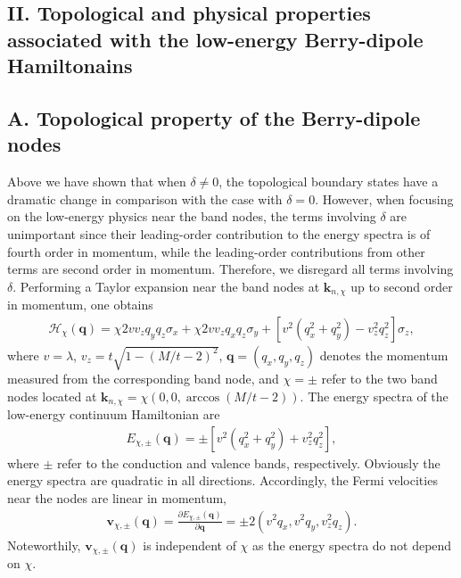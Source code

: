 \documentclass[aps,prl,twocolumn,longbibliography]{revtex4-1}
\newcommand{\bk}{\boldsymbol k}
\newcommand{\bq}{\boldsymbol q}
\newcommand{\bv}{\boldsymbol v}
\begin{document}
\begin{widetext}
\section{II. Topological and physical properties associated with the low-energy Berry-dipole Hamiltonains}

\subsection{A. Topological property of the Berry-dipole nodes}

Above we have shown that when $\delta\neq0$, the topological boundary states have a dramatic change in comparison with
the case with $\delta=0$. However,
when focusing on the low-energy physics near the band nodes, the terms involving $\delta$ are unimportant since their leading-order contribution to the energy spectra is  of fourth order in momentum, while the leading-order contributions from other terms are second order in momentum. Therefore,  we disregard all terms
involving $\delta$.  Performing a Taylor expansion near the band nodes at $\bk_{n,\chi}$ up to second order in momentum, one obtains
\begin{eqnarray} \mathcal{H}_{\chi}(\bq)=\chi2vv_{z}q_{y}q_{z}\sigma_{x}+\chi2vv_{z}q_{x}q_{z}\sigma_{y}+\left[v^{2}(q_{x}^{2}+q_{y}^{2})-v_{z}^{2}q_{z}^{2}\right]\sigma_{z},
	\label{eq: lowH}
\end{eqnarray}
where $v=\lambda$, $v_{z}=t\sqrt{1-(M/t-2)^2}$, $\bq=(q_{x},q_{y},q_{z})$ denotes the momentum measured from
the corresponding band node, and $\chi=\pm$ refer to the two band nodes located at $\bk_{n,\chi}=\chi(0,0,\arccos(M/t-2))$. The energy spectra of
the low-energy continuum Hamiltonian are
\begin{eqnarray}
	E_{\chi,\pm}(\bq)=\pm\left[v^{2}(q_{x}^{2}+q_{y}^{2})+v_{z}^{2}q_{z}^{2}\right],
\end{eqnarray}
where $\pm$ refer to the conduction and valence bands, respectively. Obviously the energy spectra are quadratic in all directions. Accordingly, the Fermi velocities near the nodes are linear in momentum,
\begin{eqnarray}
	\bv_{\chi,\pm}(\bq)=\frac{\partial E_{\chi,\pm}(\bq)}{\partial \bq}=\pm2(v^{2}q_{x},v^{2}q_{y},v_{z}^{2}q_{z}).
\end{eqnarray}
Noteworthily,  $\bv_{\chi,\pm}(\bq)$ is independent of $\chi$ as the energy spectra do not depend on $\chi$.



\end{widetext}
\end{document}
